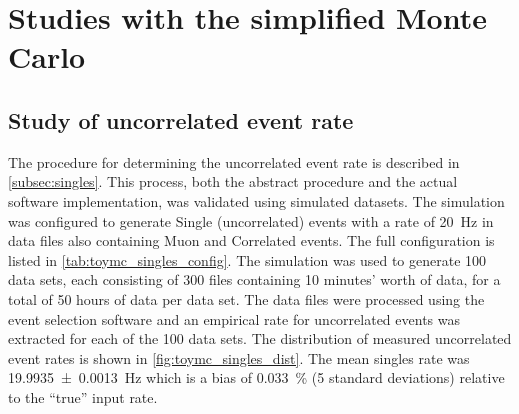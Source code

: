 \section{Studies with the simplified Monte Carlo}
\label{sec:toymc_studies}
\subsection{Study of uncorrelated event rate}

The procedure for determining the uncorrelated event rate
is described in \cref{subsec:singles}.
This process, both the abstract procedure and the actual software implementation,
was validated using simulated datasets.
The simulation was configured to generate Single (uncorrelated) events
with a rate of \SI{20}{\Hz}
in data files also containing Muon and Correlated events.
The full configuration is listed in \cref{tab:toymc_singles_config}.
The simulation was used to generate 100 data sets,
each consisting of 300 files containing 10 minutes' worth of data,
for a total of 50 hours of data per data set.
The data files were processed using the event selection software
and an empirical rate for uncorrelated events was extracted
for each of the 100 data sets.
The distribution of measured uncorrelated event rates
is shown in \cref{fig:toymc_singles_dist}.
The mean singles rate was \SI{19.9935+-0.0013}{\Hz}
which is a bias of \SI{0.033}{\percent} (5 standard deviations)
relative to the ``true'' input rate.


